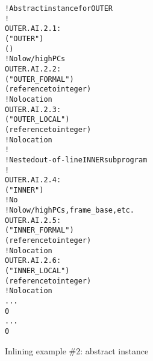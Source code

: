 \begin{figure}[t]
\begin{dwflisting}
\begin{alltt}
    ! Abstract instance for OUTER
    ! 
OUTER.AI.2.1:
        ("OUTER")
        ()
        ! No low/high PCs
OUTER.AI.2.2:
            ("OUTER\_FORMAL")
            (reference to integer)
            ! No location
OUTER.AI.2.3:
            ("OUTER\_LOCAL")
            (reference to integer)
            ! No location
        !
        ! Nested out-of-line INNER subprogram
        !
OUTER.AI.2.4:
            ("INNER")
            ! No 
            ! No low/high PCs, frame\_base, etc.
OUTER.AI.2.5:
                ("INNER\_FORMAL")
                (reference to integer)
                ! No location
OUTER.AI.2.6:
                ("INNER\_LOCAL")
                (reference to integer)
                ! No location
            ...
            0
        ...
        0
\end{alltt}
\end{dwflisting}
\caption{Inlining example \#2: abstract instance}
\label{fig:inliningexample2abstractinstance}
\end{figure}

